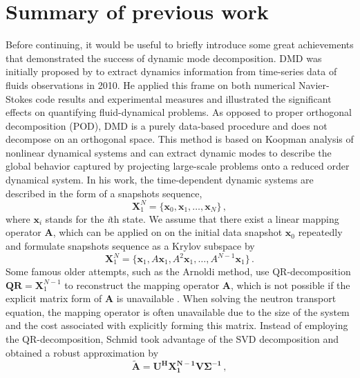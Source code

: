 \section{Summary of previous work}
Before continuing, it would be useful to briefly introduce some great achievements that demonstrated the success of dynamic mode decomposition.
DMD was initially proposed by \citet{schmid_dynamic_2010}\cite{schmid_applications_2011} to extract dynamics information from time-series data of fluids observations in 2010.
He applied this frame on both numerical Navier-Stokes code results and experimental measures and illustrated the significant effects on quantifying fluid-dynamical problems.
As opposed to proper orthogonal decomposition (POD)\cite{lumley2007stochastic}, DMD is a purely data-based procedure and does not decompose on an orthogonal space. 
This method is based on Koopman analysis\cite{lasota2013chaos,mezic2005spectral} of nonlinear dynamical systems and can extract dynamic modes to describe the global behavior captured by projecting large-scale problems onto a reduced order dynamical system.
In his work, the time-dependent dynamic systems are described in the form of a snapshots sequence,
\begin{equation}
 \mathbf{X}^{N}_1 = \{\mathbf{x}_0, \mathbf{x}_1, \ldots, \mathbf{x}_{N} \} \, ,
 \label{eq:snap_matrix}
\end{equation}
where $\mathbf{x}_i$ stands for the {\it i}th state.
We assume that there exist a linear mapping operator $\mathbf{A}$, which can be applied on on the initial data snapshot $\mathbf{x}_0$ repeatedly and formulate snapshots sequence  as a Krylov subspace by
\begin{equation}
 \mathbf{X}^{N}_1 = \{\mathbf{x}_1,A\mathbf{x}_1,A^2\mathbf{x}_1,…,A^{N-1}\mathbf{x}_1 \} \, .
 \label{eq:Krylov_seq}
\end{equation}
Some famous older attempts, such as the Arnoldi method\cite{arnoldi1951principle}, use QR-decomposition $\mathbf{QR} = \mathbf{X}^{N-1}_1$ to reconstruct the mapping operator $\mathbf{A}$, which is not possible if  the explicit matrix form of  $\mathbf{A}$ is unavailable \cite{Greenbaum_1997, trefethen1997numerical}.
When solving the neutron transport equation, the mapping operator is often unavailable due to the size of the system and the cost associated with explicitly forming this matrix.
Instead of employing the QR-decomposition, Schmid took advantage of the SVD decomposition and obtained a robust approximation by 
\begin{equation}
\mathbf{\tilde{A}} = \mathbf{U^H X_1^{N-1}V\Sigma^{-1}} \, ,
 \label{eq:stanard_DMD}
\end{equation}
